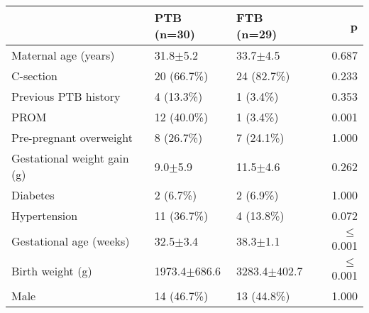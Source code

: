 \begin{tabular}{l|llr}
 & PTB (n=30) & FTB (n=29) & p \\ \hline
Maternal age (years) & 31.8$\pm$5.2 & 33.7$\pm$4.5 & 0.687 \\
C-section & 20 (66.7\%) & 24 (82.7\%) & 0.233 \\
Previous PTB history & 4 (13.3\%) & 1 (3.4\%) & 0.353 \\
PROM & 12 (40.0\%) & 1 (3.4\%) & 0.001 \\
Pre-pregnant overweight & 8 (26.7\%) & 7 (24.1\%) & 1.000 \\
Gestational weight gain (g) & 9.0$\pm$5.9 & 11.5$\pm$4.6 & 0.262 \\
Diabetes & 2 (6.7\%) & 2 (6.9\%) & 1.000 \\
Hypertension & 11 (36.7\%) & 4 (13.8\%) & 0.072 \\
Gestational age (weeks) & 32.5$\pm$3.4 & 38.3$\pm$1.1 & $\le$0.001 \\
Birth weight (g) & 1973.4$\pm$686.6 & 3283.4$\pm$402.7 & $\le$0.001 \\
Male & 14 (46.7\%) & 13 (44.8\%) & 1.000
\end{tabular}
